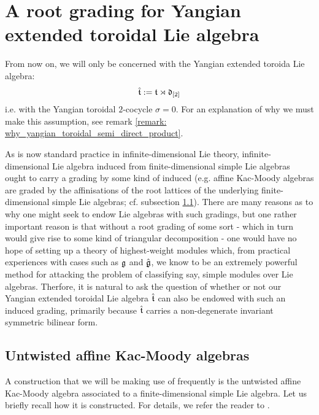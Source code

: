 \section{A root grading for Yangian extended toroidal Lie algebra} \label{section: root_grading_for_yangian_EALAs}
    From now on, we will only be concerned with the Yangian extended toroida Lie algebra:
        $$\hat{\mathfrak{t}} := \mathfrak{t} \rtimes \mathfrak{d}_{[2]}$$
    i.e. with the Yangian toroidal $2$-cocycle $\sigma = 0$. For an explanation of why we must make this assumption, see remark \ref{remark: why_yangian_toroidal_semi_direct_product}.

    As is now standard practice in infinite-dimensional Lie theory, infinite-dimensional Lie algebra induced from finite-dimensional simple Lie algebras ought to carry a grading by some kind of induced  (e.g. affine Kac-Moody algebras are graded by the affinisations of the root lattices of the underlying finite-dimensional simple Lie algebras; cf. subsection \ref{subsection: a_fixed_untwisted_affine_kac_moody_algebra}). There are many reasons as to why one might seek to endow Lie algebras with such gradings, but one rather important reason is that without a root grading of some sort - which in turn would give rise to some kind of triangular decomposition - one would have no hope of setting up a theory of highest-weight modules which, from practical experiences with cases such as $\mathfrak{g}$ and $\hat{\mathfrak{g}}$, we know to be an extremely powerful method for attacking the problem of classifying say, simple modules over Lie algebras. Therfore, it is natural to ask the question of whether or not our Yangian extended toroidal Lie algebra $\hat{\mathfrak{t}}$ can also be endowed with such an induced grading, primarily because $\hat{\mathfrak{t}}$ carries a non-degenerate invariant symmetric bilinear form.

    \subsection{Untwisted affine Kac-Moody algebras} \label{subsection: a_fixed_untwisted_affine_kac_moody_algebra}
        A construction that we will be making use of frequently is the untwisted affine Kac-Moody algebra associated to a finite-dimensional simple Lie algebra. Let us briefly recall how it is constructed. For details, we refer the reader to \cite[Chapters 6 and 7]{kac_infinite_dimensional_lie_algebras}.

